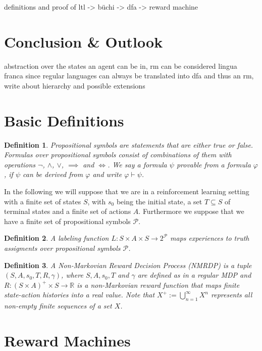 \documentclass[12pt, a4paper]{article}
\theoremstyle{plain}
\newtheorem*{definition}{Definition}
\renewcommand{\phi}{\varphi}
\begin{document}
definitions and proof of ltl -> büchi -> dfa -> reward machine

\section*{Conclusion \& Outlook}

abstraction over the states an agent can be in, rm can be considered lingua franca since regular languages can always be translated into dfa and thus an rm, write about hierarchy and possible extensions

\section*{Basic Definitions}

\begin{definition}
	\emph{Propositional symbols} are statements that are either true or false. \emph{Formulas} over propositional symbols consist of combinations of them with operations $\neg$, $\wedge$, $\vee$, $\implies$ and $\iff$. We say a formula $\psi$ \emph{provable} from a formula $\phi$, if $\psi$ can be derived from $\phi$ and write $\phi \vdash \psi$.
\end{definition}

In the following we will suppose that we are in a reinforcement learning setting with a finite set of states $S$, with $s_0$ being the initial state, a set $T \subseteq S$ of terminal states and a finite set of actions $A$. Furthermore we suppose that we have a finite set of propositional symbols $\mathcal{P}$.

\begin{definition}
	A \emph{labeling function} $L : S \times A \times S \to 2^{\mathcal{P}}$ maps experiences to truth assigments over propositional symbols $\mathcal{P}$.
\end{definition}

\begin{definition}
	A \emph{Non-Markovian Reward Decision Process (NMRDP)} is a tuple $(S, A, s_0, T, R, \gamma)$, where $S, A, s_0, T$ and $\gamma$ are defined as in a regular MDP and $R : (S \times A)^+ \times S \to \mathbb{R}$ is a non-Markovian reward function that maps finite state-action histories into a real value. Note that $X^+ := \bigcup_{n=1}^{\infty} X^n$ represents all non-empty finite sequences of a set $X$.
\end{definition}

\section*{Reward Machines}
\end{document}
